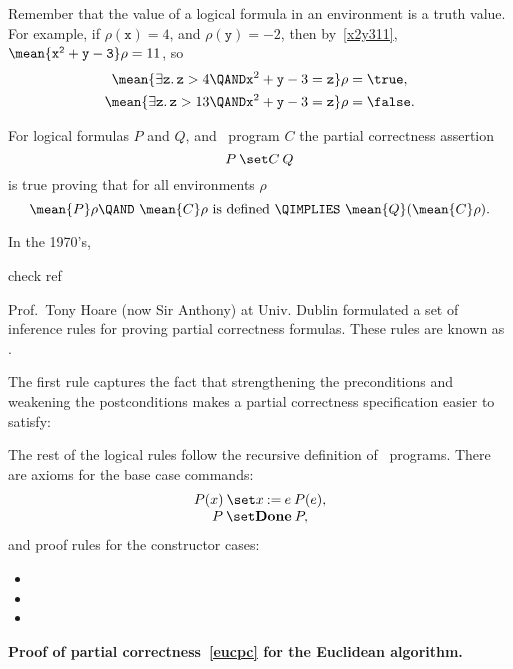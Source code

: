 Remember that the value of a logical formula in an environment is a truth value.
For example, if $\rho(\mathtt{x}) =4$, and $\rho(\mathtt{y}) =-2$, then
by~\eqref{x2y311}, $\mean{\mathtt{x^2+y -3}}\rho = 11$, so
\begin{align*}
\mean{\exists \mathtt{z}.\, \mathtt{z} > 4 \QAND \mathtt{x}^2+\mathtt{y} -3=\mathtt{z}}\rho & = \true,\\
\mean{\exists \mathtt{z}.\, \mathtt{z} > 13 \QAND \mathtt{x}^2+\mathtt{y} -3=\mathtt{z}}\rho & = \false.
\end{align*}

\begin{definition}\label{def_afterPCQ}
For logical formulas $P$ and $Q$, and \while\ program $C$ the
partial correctness assertion
\[
\after{P}{C}{Q}
\]
is true proving that for all environments $\rho$
\[
\mean{P}\rho \QAND\ \mean{C}\rho \text{ is defined}\ \QIMPLIES\ \mean{Q}(\mean{C}\rho).
\]
\iffalse
 if $\mean{P}\rho$ is
true, and $\haltswith{C}{\rho}{\rho'}$ for some $\rho'$, then
$\mean{Q}\rho'$ is true.\fi
\end{definition}


In the 1970's, 
\begin{editingnotes}
check ref
\end{editingnotes}
Prof.\ Tony Hoare (now Sir Anthony) at Univ. Dublin formulated a set
of inference rules for proving partial correctness formulas.  These
rules are known as .

The first rule captures the fact that strengthening the preconditions
and weakening the postconditions makes a partial correctness
specification easier to satisfy:


The rest of the logical rules follow the recursive definition of \while\ programs.
There are axioms for the base case commands:
\[\begin{array}{c}
  \after{P(x)}{x \assigned e}{P(e)},\\
  \after{P}{\halt}{P},
\end{array}\]
and proof rules for the constructor cases:

\begin{itemize}

\item
{}

\item
{}
        {}

\item
{}
     {}
\end{itemize}

\begin{example}
\textbf{Proof of partial correctness~\eqref{eucpc} for the Euclidean algorithm.}
\end{example}


\endinput
